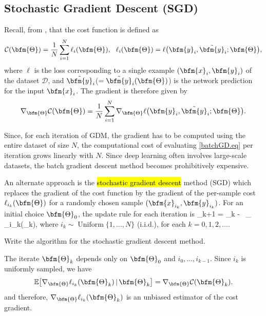 \subsection{Stochastic Gradient Descent (SGD)}
Recall, from , that the cost function is defined as
$$
\mathcal{C}(\bfm{\Theta}) = \frac{1}{N}\sum_{i=1}^N \ell_i(\bfm{\Theta}),~~ \ell_i(\bfm{\Theta}) = \ell\big(\bfm{y}_i,\tilde{\bfm{y}}_i;\bfm{\Theta}\big),
$$
where $\ell$ is the loss corresponding to a single example $(\bfm{x}_i, \bfm{y}_i)$ of the dataset $\mathcal{D}$, and $\tilde{\bfm{y}}_i$($=\tilde{\bfm{y}}_i(\bfm{\Theta})$) is the network prediction for the input $\bfm{x}_i$. The gradient is therefore given by
$$
\nabla_{\bfm{\Theta}} \mathcal{C}(\bfm{\Theta})
= \frac{1}{N}\sum_{i=1}^N \nabla_{\bfm{\Theta}} \ell\big(\bfm{y}_i,\tilde{\bfm{y}}_i;\bfm{\Theta}\big).
$$

Since, for each iteration of GDM, the gradient has to be computed using the entire dataset of size $N$, the computational cost of evaluating \eqref{batchGD.eq} per iteration grows linearly with $N$. Since deep learning often involves large-scale datasets, the batch gradient descent method becomes prohibitively expensive.

An alternate approach is the \hl{stochastic gradient descent} method (SGD) which replaces the gradient  of the cost function by the gradient of the per-sample cost $\ell_{i_k}(\bfm{\Theta})$ for a randomly chosen sample $(\bfm{x}_{i_k},\bfm{y}_{i_k})$. For an initial choice $\bfm{\Theta}_{0}$, the update rule for each iteration is
\bea\label{SGD}
\bfm{\Theta}_{k+1} = \bfm{\Theta}_k - \eta \, \nabla_{\bfm{\Theta}} \ell_{i_k}(\bfm{\Theta}_k),
\eea
where  $i_k \sim
\operatorname{Uniform}\{1,\ldots,N\}$ (i.i.d.), for each $k=0,1,2, \ldots.$
\begin{problem}
Write the algorithm for the stochastic gradient descent method.
\end{problem}

The iterate $\bfm{\Theta}_k$ depends only on $\bfm{\Theta}_0$ and $i_0,\ldots,i_{k-1}$.  Since $i_k$ is uniformly sampled, we have
$$
\mathbb{E}\!\left[\nabla_{\bfm{\Theta}} \ell_{i_k}(\bfm{\Theta}_k)\, | \, \bfm{\Theta}_k \right]
= \nabla_{\bfm{\Theta}} \mathcal{C}(\bfm{\Theta}_k).
$$
and therefore, $\nabla_{\bfm{\Theta}} \ell_{i_k}(\bfm{\Theta}_k)$ is an unbiased estimator of the cost gradient.


